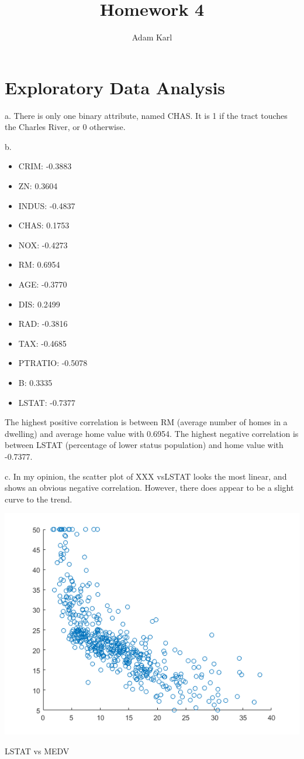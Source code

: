 \documentclass[a4paper]{article}
\title{Homework 4}
\author{Adam Karl}
\begin{document}
\maketitle

\section{Exploratory Data Analysis}

\noindent
a. There is only one binary attribute, named CHAS. It is 1 if the tract touches the Charles River, or 0 otherwise.

\noindent 
b. 

\begin{itemize}
    \item CRIM: -0.3883
    \item ZN: 0.3604
    \item INDUS: -0.4837
    \item CHAS: 0.1753
    \item NOX: -0.4273
    \item RM: 0.6954
    \item AGE: -0.3770
    \item DIS: 0.2499
    \item RAD: -0.3816
    \item TAX: -0.4685
    \item PTRATIO: -0.5078
    \item B: 0.3335
    \item LSTAT: -0.7377
\end{itemize}

\noindent
The highest positive correlation is between RM (average number of homes in a dwelling) and average home value with 0.6954. The highest negative correlation is between LSTAT (percentage of lower status population) and home value with -0.7377.


\noindent
c. In my opinion, the scatter plot of XXX vsLSTAT looks the most linear, and shows an obvious negative correlation. However, there does appear to be a slight curve to the trend.

\begin{center}
    \includegraphics[scale=1]{1c-1.png}
    \caption{LSTAT vs MEDV}
\end{center}
\end{document}
